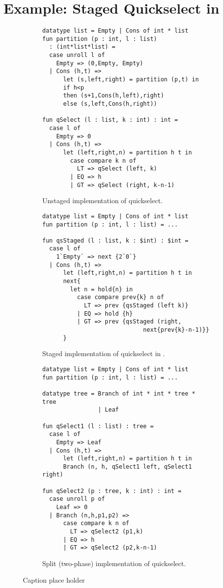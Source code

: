 \section {Example: Staged Quickselect in \texorpdfstring{\lang}{λ12}}
\label{sec:staging}

\begin{figure*}
\begin{subfigure}{0.5\textwidth}
\begin{lstlisting} 
datatype list = Empty | Cons of int * list
fun partition (p : int, l : list) 
  : (int*list*list) =
  case unroll l of 
    Empty => (0,Empty, Empty) 
  | Cons (h,t) =>
      let (s,left,right) = partition (p,t) in
      if h<p 
      then (s+1,Cons(h,left),right)
      else (s,left,Cons(h,right))

fun qSelect (l : list, k : int) : int = 
  case l of
    Empty => 0
  | Cons (h,t) => 
      let (left,right,n) = partition h t in
        case compare k n of
          LT => qSelect (left, k)
        | EQ => h
        | GT => qSelect (right, k-n-1)
\end{lstlisting}
\caption{Unstaged implementation of quickselect.}
\label{fig:quickselect}
\end{subfigure}%
\begin{subfigure}{0.5\textwidth}
\begin{lstlisting} 
datatype list = Empty | Cons of int * list
fun partition (p : int, l : list) = ...

fun qsStaged (l : list, k : $int) : $int = 
  case l of
    1`Empty` => next {2`0`}
  | Cons (h,t) => 
      let (left,right,n) = partition h t in
      next{
        let n = hold{n} in
          case compare prev{k} n of
            LT => prev {qsStaged (left k)}
          | EQ => hold {h}
          | GT => prev {qsStaged (right, 
                             next{prev{k}-n-1)}}
      }	
\end{lstlisting}
\caption{Staged implementation of quickselect in \lang.}
\label{fig:qsstaged}
\end{subfigure}
\begin{subfigure}{0.5\textwidth}
\begin{lstlisting}
datatype list = Empty | Cons of int * list
fun partition (p : int, l : list) = ...
	
datatype tree = Branch of int * int * tree * tree
                | Leaf

fun qSelect1 (l : list) : tree =
  case l of
    Empty => Leaf
  | Cons (h,t) => 
      let (left,right,n) = partition h t in
      Branch (n, h, qSelect1 left, qSelect1 right)

fun qSelect2 (p : tree, k : int) : int = 
  case unroll p of
    Leaf => 0
  | Branch (n,h,p1,p2) => 
      case compare k n of
        LT => qSelect2 (p1,k)
      | EQ => h
      | GT => qSelect2 (p2,k-n-1)
\end{lstlisting}
\caption{Split (two-phase) implementation of quickselect.}
\label{fig:qssplit}
\end{subfigure}
\caption{Caption place holder}
\end{figure*}

